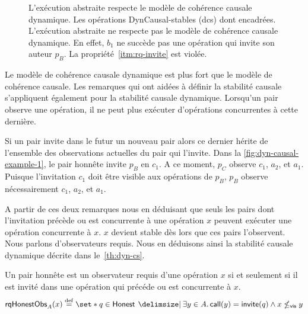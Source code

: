 \begin{figure}[htb]
\begin{subfigure}{\linewidth}
    \caption{}\label{fig:dyn-causal-example-2}
\end{subfigure}
\caption[Stabilité causale dynamique]{L'exécution abstraite  respecte le modèle de cohérence causale dynamique.
Les opérations DynCausal-stables (dcs) dont encadrées.
L'exécution abstraite  ne respecte pas le modèle de cohérence causale dynamique.
En effet, $b_1$ ne succède pas une opération qui invite son auteur $p_B$.
La propriété~\ref{itm:rq-invite} est violée.}\label{fig:dyn-causal-example}
\end{figure}

Le modèle de cohérence causale dynamique est plus fort que le modèle de cohérence causale.
Les remarques qui ont aidées à définir la stabilité causale s'appliquent également pour la stabilité causale dynamique.
Lorsqu'un pair observe une opération, il ne peut plus exécuter d'opérations concurrentes à cette dernière.

Si un pair invite dans le futur un nouveau pair alors ce dernier hérite de l'ensemble des observations actuelles du pair qui l'invite.
Dans la \autoref{fig:dyn-causal-example-1}, le pair honnête invite $p_B$ en $c_1$.
A ce moment, $p_C$ observe $c_1$, $a_2$, et $a_1$.
Puisque l'invitation $c_1$ doit être visible aux opérations de $p_B$, $p_B$ observe nécessairement $c_1$, $a_2$, et $a_1$.


A partir de ces deux remarques nous en déduisant que seuls les pairs dont l'invitation précède ou est concurrente à une opération $x$ peuvent exécuter une opération concurrente à $x$.
$x$ devient stable dès lors que ces pairs l'observent.
Nous parlons d'observateurs requis.
Nous en déduisons ainsi la stabilité causale dynamique décrite dans le~\autoref{th:dyn-cs}.

\begin{definition}
Un pair honnête est un observateur requis d'une opération $x$ si et seulement si il est invité dans une opération qui précéde ou est concurrente à $x$.
\begin{equation*}
    \trm{rqHonestObs}_A(x) \defeq \set*{q \in \trm{Honest} \given \exists y \in A \qsep \trm{call}(y) = \trm{invite}(q) \land x \nviseq y}
\end{equation*}
\end{definition}


